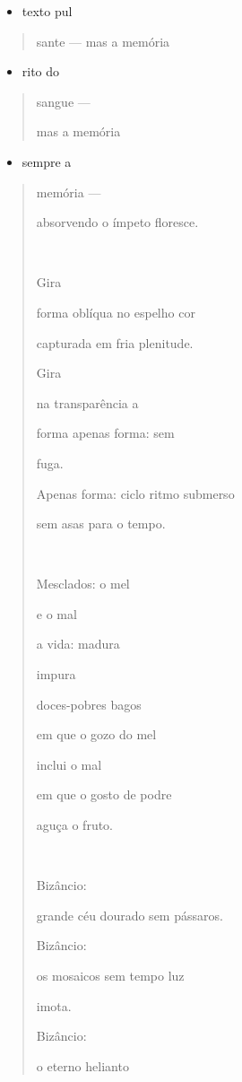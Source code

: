 \begin{itemize}
\item
  texto pul
\end{itemize}

\begin{quote}
sante --- mas a memória
\end{quote}

\begin{itemize}
\item
  rito do
\end{itemize}

\begin{quote}
sangue ---

mas a memória
\end{quote}

\begin{itemize}
\item
  sempre a
\end{itemize}

\begin{quote}
memória ---

absorvendo o ímpeto floresce.



Gira

forma oblíqua no espelho cor

capturada em fria plenitude.

Gira

na transparência a

forma apenas forma: sem

fuga.

Apenas forma: ciclo ritmo submerso

sem asas para o tempo.



Mesclados: o mel

e o mal

a vida: madura

impura

doces-pobres bagos

em que o gozo do mel

inclui o mal

em que o gosto de podre

aguça o fruto.



Bizâncio:

grande céu dourado sem pássaros.

Bizâncio:

os mosaicos sem tempo luz

imota.

Bizâncio:

o eterno helianto
\end{quote}

